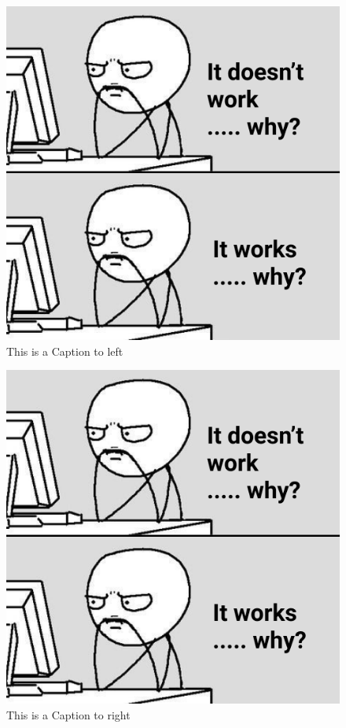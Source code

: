 \documentclass[12pt]{article}
\begin{document}
\begin{figure}[H]
    \captionsetup{justification=raggedright,singlelinecheck=false}
    \includegraphics[width=.6\textwidth, left]{img}
    \caption{This is a Caption to left  \label{figure:cap-left}}
\end{figure}

\begin{figure}[H]
    \captionsetup{justification=raggedleft,singlelinecheck=false}
    \includegraphics[width=.6\textwidth, right]{img}
    \caption{This is a Caption to right  \label{figure:cap-right}}
\end{figure}
\end{document}
